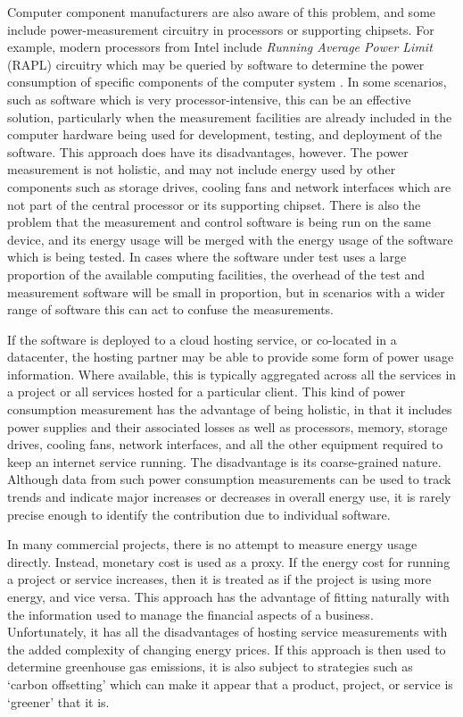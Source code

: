Computer component manufacturers are also aware of this problem, and some include power-measurement circuitry in processors or supporting chipsets. For example, modern processors from Intel include \emph{Running Average Power Limit} (RAPL) circuitry which may be queried by software to determine the power consumption of specific components of the computer system \citep{Travers2015} \citep{Hahnel2012}. In some scenarios, such as software which is very processor-intensive, this can be an effective solution, particularly when the measurement facilities are already included in the computer hardware being used for development, testing, and deployment of the software. This approach does have its disadvantages, however. The power measurement is not holistic, and may not include energy used by other components such as storage drives, cooling fans and network interfaces which are not part of the central processor or its supporting chipset. There is also the problem that the measurement and control software is being run on the same device, and its energy usage will be merged with the energy usage of the software which is being tested. In cases where the software under test uses a large proportion of the available computing facilities, the overhead of the test and measurement software will be small in proportion, but in scenarios with a wider range of software this can act to confuse the measurements.

If the software is deployed to a cloud hosting service, or co-located in a datacenter, the hosting partner may be able to provide some form of power usage information. Where available, this is typically aggregated across all the services in a project or all services hosted for a particular client. This kind of power consumption measurement has the advantage of being holistic, in that it includes power supplies and their associated losses as well as processors, memory, storage drives, cooling fans, network interfaces, and all the other equipment required to keep an internet service running. The disadvantage is its coarse-grained nature. Although data from such power consumption measurements can be used to track trends and indicate major increases or decreases in overall energy use, it is rarely precise enough to identify the contribution due to individual software.

In many commercial projects, there is no attempt to measure energy usage directly. Instead, monetary cost is used as a proxy. If the energy cost for running a project or service increases, then it is treated as if the project is using more energy, and vice versa. This approach has the advantage of fitting naturally with the information used to manage the financial aspects of a business. Unfortunately, it has all the disadvantages of hosting service measurements with the added complexity of changing energy prices. If this approach is then used to determine greenhouse gas emissions, it is also subject to strategies such as `carbon offsetting' which can make it appear that a product, project, or service is `greener' that it is.

